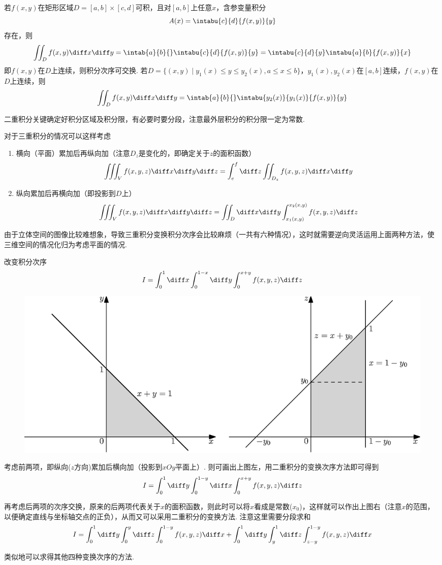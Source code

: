 \begin{theorem}
若$f(x,y)$在矩形区域$D=[a,b]\times[c,d]$可积，且对$[a,b]$上任意$x$，含参变量积分
\[A(x)=\intabu{c}{d}{f(x,y)}{y}\]
存在，则
\[\iint_Df(x,y)\diff x\diff y=\intab{a}{b}{}\intabu{c}{d}{f(x,y)}{y}=\intabu{c}{d}{y}\intabu{a}{b}{f(x,y)}{x}\]
即$f(x,y)$在$D$上连续，则积分次序可交换.
若$D=\{(x,y)\mid y_1(x)\leq y\leq y_2(x),a\leq x\leq b\}$，$y_1(x),y_2(x)$在$[a,b]$连续，$f(x,y)$在$D$上连续，则
\[\iint_Df(x,y)\diff x\diff y=\intab{a}{b}{}\intabu{y_2(x)}{y_1(x)}{f(x,y)}{y}\]
\end{theorem}
\par 二重积分关键确定好积分区域及积分限，有必要时要分段，注意最外层积分的积分限一定为常数.
\par 对于三重积分的情况可以这样考虑
\begin{enumerate}
	\item 横向（平面）累加后再纵向加（注意$D_z$是变化的，即确定关于$z$的面积函数）
	\[\iiint_Vf(x,y,z)\diff x\diff y\diff z=\int_e^f\diff z\iint_{D_z}f(x,y,z)\diff x\diff y\]
	\item 纵向累加后再横向加（即投影到$D$上）
	\[\iiint_Vf(x,y,z)\diff x\diff y\diff z=\iint_D\diff x\diff y\int_{x_1(x,y)}^{x_2(x,y)}f(x,y,z)\diff z\]
\end{enumerate}
\par 由于立体空间的图像比较难想象，导致三重积分变换积分次序会比较麻烦（一共有六种情况），这时就需要逆向灵活运用上面两种方法，使三维空间的情况化归为考虑平面的情况.
\begin{example}
改变积分次序
\[I=\int_0^1\diff x\int_0^{1-x}\diff y\int_0^{x+y}f(x,y,z)\diff z\]
\end{example}
\begin{analysis}
\begin{figure}[H]
\centering
\includegraphics[width=0.6\linewidth]{fig/coordinate_eg.eps}
\end{figure}
考虑前两项，即纵向($z$方向)累加后横向加（投影到$xOy$平面上）.
则可画出上图左，用二重积分的变换次序方法即可得到
\[I=\int_0^1\diff y\int_0^{1-y}\diff x\int_0^{x+y}f(x,y,z)\diff z\]
\par 再考虑后两项的次序交换，原来的后两项代表关于$x$的面积函数，则此时可以将$x$看成是常数($x_0$)，这样就可以作出上图右（注意$x$的范围，以便确定直线与坐标轴交点的正负），从而又可以采用二重积分的变换方法.
注意这里需要分段求和
\[I=\int_0^1\diff y\int_0^y\diff z\int_0^{1-y}f(x,y,z)\diff x+\int_0^1\diff y\int_y^1\diff z\int_{z-y}^{1-y}f(x,y,z)\diff x\]
\par 类似地可以求得其他四种变换次序的方法.
\end{analysis}

